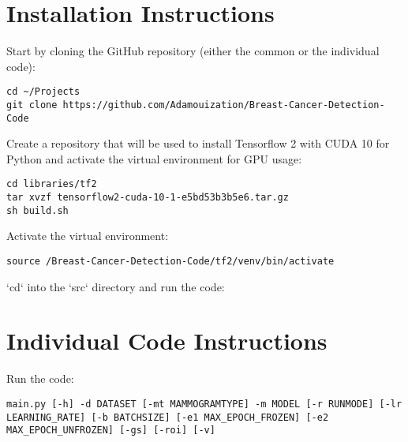 \section{Installation Instructions}

Start by cloning the GitHub repository (either the common or the individual code):

\begin{lstlisting}
cd ~/Projects
git clone https://github.com/Adamouization/Breast-Cancer-Detection-Code
\end{lstlisting}

Create a repository that will be used to install Tensorflow 2 with CUDA 10 for Python and activate the virtual environment for GPU usage:

\begin{lstlisting}
cd libraries/tf2
tar xvzf tensorflow2-cuda-10-1-e5bd53b3b5e6.tar.gz
sh build.sh
\end{lstlisting}

Activate the virtual environment:

\begin{lstlisting}
source /Breast-Cancer-Detection-Code/tf2/venv/bin/activate
\end{lstlisting}

`cd` into the `src` directory and run the code:


\section{Individual Code Instructions}
\label{sec:appendix-individual-pipeline-instructions}

Run the code:

\begin{lstlisting}
main.py [-h] -d DATASET [-mt MAMMOGRAMTYPE] -m MODEL [-r RUNMODE] [-lr LEARNING_RATE] [-b BATCHSIZE] [-e1 MAX_EPOCH_FROZEN] [-e2 MAX_EPOCH_UNFROZEN] [-gs] [-roi] [-v]
\end{lstlisting}

